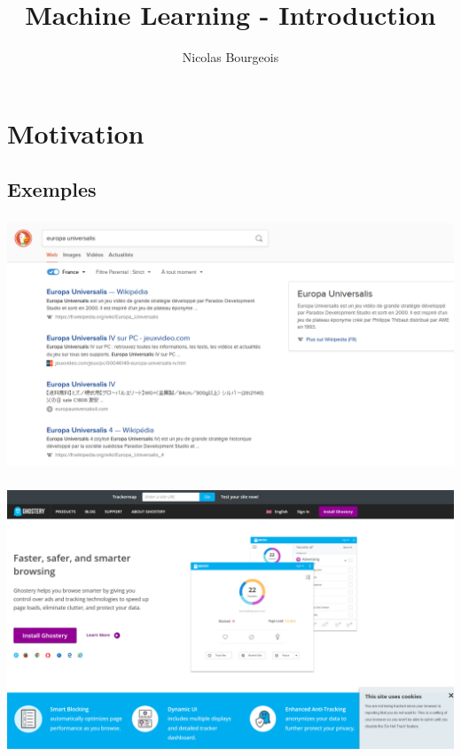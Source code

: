 \documentclass[11pt]{beamer}
\title{Machine Learning - Introduction}
\author{Nicolas Bourgeois}
\date{}
\newenvironment{slide}[1]{%
\begin{frame}[environment=slide]
\frametitle{#1}
}{%
\end{frame}
}
\begin{document}
\begin{frame}
\maketitle
\end{frame}

\begin{frame}
\small
\tableofcontents
\end{frame}

\section{Motivation}

\subsection{Exemples}

\begin{slide}{}

\includegraphics[scale=0.25]{A1ranking}

\end{slide}

\begin{slide}{}

\includegraphics[scale=0.2]{A2targeting}

\end{slide}
\end{document}
